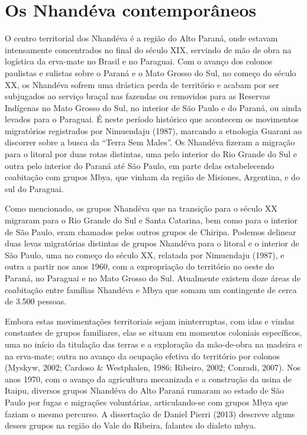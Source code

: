 \section{Os Nhandéva contemporâneos}

O centro territorial dos Nhandéva é a região do Alto Paraná, onde
estavam intensamente concentrados no final do século XIX, servindo de
mão de obra na logística da erva-mate no Brasil e no Paraguai. Com o
avanço dos colonos paulistas e sulistas sobre o Paraná e o Mato Grosso
do Sul, no começo do século XX, os Nhandéva sofrem uma drástica perda
de território e acabam por ser subjugados ao serviço braçal nas
fazendas ou removidos para as Reservas Indígenas no Mato Grosso do Sul,
no interior de São Paulo e do Paraná, ou ainda levados para o Paraguai.
É neste período histórico que acontecem os movimentos migratórios
registrados por Nimuendaju (1987), marcando a etnologia Guarani ao
discorrer sobre a busca da ``Terra Sem Males''. Os Nhandéva fizeram a
migração para o litoral por duas rotas distintas, uma pelo interior do
Rio Grande do Sul e outra pelo interior do Paraná até São Paulo, em
parte delas estabelecendo coabitação com grupos Mbya, que vinham da
região de Misiones, Argentina, e do sul do Paraguai.

Como mencionado, os grupos Nhandéva que na transição para o século XX
migraram para o Rio Grande do Sul e Santa Catarina, bem como para o
interior de São Paulo, eram chamados pelos outros grupos de Chiripa.
Podemos delinear duas levas migratórias distintas de grupos Nhandéva
para o litoral e o interior de São Paulo, uma no começo do século XX,
relatada por Nimuendaju (1987), e outra a partir nos anos 1960, com a
expropriação do território no oeste do Paraná, no Paraguai e no Mato
Grosso do Sul. Atualmente existem doze áreas de coabitação entre
famílias Nhandéva e Mbya que somam um contingente de cerca de 3.500
pessoas.

Embora estas movimentações territoriais sejam ininterruptas, com idas e
vindas constantes de grupos familiares, elas se situam em momentos
coloniais específicos, uma no início da titulação das terras e a
exploração da mão-de-obra na madeira e na erva-mate; outra no avanço da
ocupação efetiva do território por colonos (Myskyw, 2002; Cardoso \&
Westphalen, 1986; Ribeiro, 2002; Conradi, 2007). Nos anos 1970, com o
avanço da agricultura mecanizada e a construção da usina de Itaipu,
diversos grupos Nhandéva do Alto Paraná rumaram ao estado de São Paulo
por fugas e migrações voluntárias, articulando-se com grupos Mbya que
faziam o mesmo percurso. A dissertação de Daniel Pierri (2013) descreve
alguns desses grupos na região do Vale do Ribeira, falantes do dialeto
mbya.

